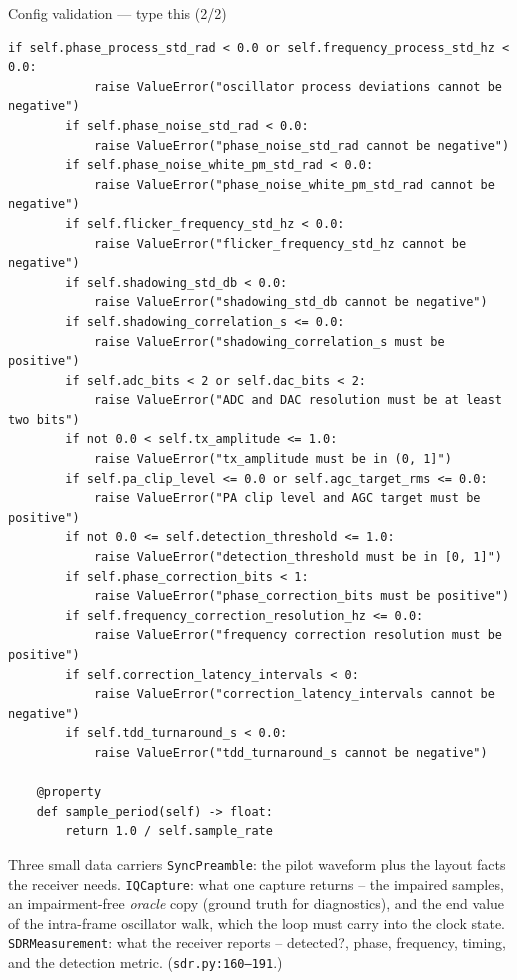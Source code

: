 \documentclass[10pt]{beamer}
\begin{document}
\begin{frame}[fragile]{Config validation --- type this (2/2)}
\begin{lstlisting}[basicstyle=\ttfamily\tiny]
        if self.phase_process_std_rad < 0.0 or self.frequency_process_std_hz < 0.0:
            raise ValueError("oscillator process deviations cannot be negative")
        if self.phase_noise_std_rad < 0.0:
            raise ValueError("phase_noise_std_rad cannot be negative")
        if self.phase_noise_white_pm_std_rad < 0.0:
            raise ValueError("phase_noise_white_pm_std_rad cannot be negative")
        if self.flicker_frequency_std_hz < 0.0:
            raise ValueError("flicker_frequency_std_hz cannot be negative")
        if self.shadowing_std_db < 0.0:
            raise ValueError("shadowing_std_db cannot be negative")
        if self.shadowing_correlation_s <= 0.0:
            raise ValueError("shadowing_correlation_s must be positive")
        if self.adc_bits < 2 or self.dac_bits < 2:
            raise ValueError("ADC and DAC resolution must be at least two bits")
        if not 0.0 < self.tx_amplitude <= 1.0:
            raise ValueError("tx_amplitude must be in (0, 1]")
        if self.pa_clip_level <= 0.0 or self.agc_target_rms <= 0.0:
            raise ValueError("PA clip level and AGC target must be positive")
        if not 0.0 <= self.detection_threshold <= 1.0:
            raise ValueError("detection_threshold must be in [0, 1]")
        if self.phase_correction_bits < 1:
            raise ValueError("phase_correction_bits must be positive")
        if self.frequency_correction_resolution_hz <= 0.0:
            raise ValueError("frequency correction resolution must be positive")
        if self.correction_latency_intervals < 0:
            raise ValueError("correction_latency_intervals cannot be negative")
        if self.tdd_turnaround_s < 0.0:
            raise ValueError("tdd_turnaround_s cannot be negative")

    @property
    def sample_period(self) -> float:
        return 1.0 / self.sample_rate
\end{lstlisting}
\end{frame}

\begin{frame}{Three small data carriers}
  \texttt{SyncPreamble}: the pilot waveform plus the layout
  facts the receiver needs. \texttt{IQCapture}: what one
  capture returns -- the impaired samples, an impairment-free
  \emph{oracle} copy (ground truth for diagnostics), and the
  end value of the intra-frame oscillator walk, which the loop
  must carry into the clock state. \texttt{SDRMeasurement}:
  what the receiver reports -- detected?, phase, frequency,
  timing, and the detection metric. (\texttt{sdr.py:160--191}.)
\end{frame}
\end{document}
